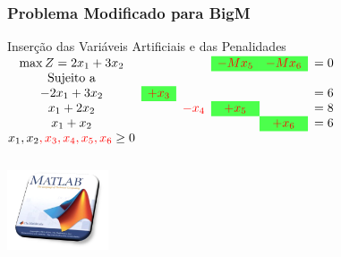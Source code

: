 \documentclass{beamer}
\begin{document}
\begin{frame}
	\frametitle{Problema Modificado para BigM}
		\begin{alertblock}{\centering Inserção das Variáveis Artificiais e das Penalidades}
			\centering
			$
				\begin{matrix}
					\max Z = 2x_1+3x_2  &                                       &                   & \cellcolor{green!70}{\color{red}-Mx_5} & \cellcolor{green!70}{\color{red}- Mx_6}  & =0 \\
					\text{Sujeito a} \\
					-2x_1+3x_2          & \cellcolor{green!70}{\color{red}+x_3} &                   &                                        &                                          & =6 \\
					x_1 + 2x_2          &                                       & {\color{red}-x_4} & \cellcolor{green!70}{\color{red}+x_5}  &                                          & =8 \\
					x_1 + x_2           &                                       &                   &                                        & \cellcolor{green!70}{\color{red}+x_6}    & =6 \\
					x_1, x_2{\color{red},x_3,x_4,x_5,x_6} \ge 0 \\
				\end{matrix}
			$
		\end{alertblock}
		\centering
		\includegraphics[width=3cm,height=3cm]{solver_matlab.png}
\end{frame}
\end{document}
